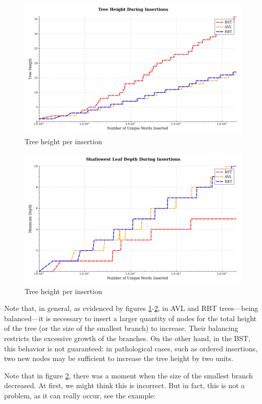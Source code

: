  \begin{figure}[H]
     \centering
     \includegraphics[width=0.75\linewidth]{img/Graph_1_10103.pdf}
     \caption{Tree height per insertion}
     \label{fig:maiorgalho}
 \end{figure}

 \begin{figure}[H]
     \centering
     \includegraphics[width=0.75\linewidth]{img/Graph_2_10103.pdf}
     \caption{Tree height per insertion}
     \label{fig:menorgalho}
 \end{figure}

 Note that, in general, as evidenced by figures \ref{fig:maiorgalho}-\ref{fig:menorgalho}, in AVL and RBT trees—being balanced—it is necessary to insert a larger quantity
 of nodes for the total height of the tree (or the size of the smallest branch) to increase. Their balancing restricts the excessive growth of the branches.
 On the other hand, in the BST, this behavior is not guaranteed: in pathological cases, such as ordered insertions,
 two new nodes may be sufficient to increase the tree height by two units.

 Note that in figure \ref{fig:menorgalho}, there was a moment when the size of the smallest branch decreased. At first,
 we might think this is incorrect. But in fact, this is not a problem,
 as it can really occur, see the example:

